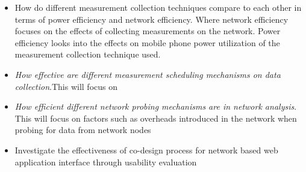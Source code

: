 \begin{itemize} %
	\item How do different measurement collection techniques compare to each other in terms of power efficiency and network efficiency. Where network efficiency focuses on the effects of collecting measurements on the network. Power efficiency looks into the effects on mobile phone power utilization of the measurement collection technique used.
	\item \textit{How effective are different measurement scheduling mechanisms on data collection}.This will focus on  %
	\item \textit{How efficient different network probing mechanisms are in network analysis}. This will focus on factors such as overheads introduced in the network when probing for data from network nodes
	\item Investigate the effectiveness of co-design process for network based web application interface through usability evaluation %

\end{itemize}